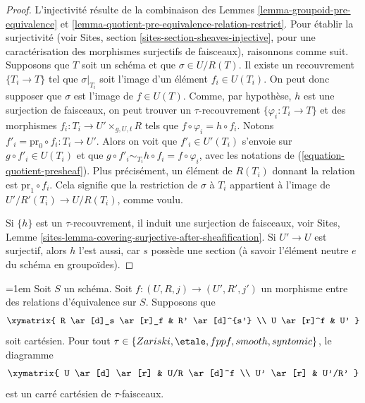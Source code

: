 \begin{proof}
L'injectivité résulte de la combinaison des
Lemmes \ref{lemma-groupoid-pre-equivalence} et
\ref{lemma-quotient-pre-equivalence-relation-restrict}.
Pour établir la surjectivité (voir
Sites, section \ref{sites-section-sheaves-injective},
pour une caractérisation des morphismes surjectifs de faisceaux), raisonnons comme suit.
Supposons que $T$ soit un schéma et que $\sigma \in U/R(T)$.
Il existe un recouvrement $\{T_i \to T\}$ tel que $\sigma|_{T_i}$
soit l'image d'un élément $f_i \in U(T_i)$. On peut donc
supposer que $\sigma$ est l'image de $f \in U(T)$.
Comme, par hypothèse, $h$ est une surjection de faisceaux, on
peut trouver un $\tau$-recouvrement $\{\varphi_i : T_i \to T\}$ et des morphismes
$f_i : T_i \to U' \times_{g, U, t} R$ tels que
$f \circ \varphi_i = h \circ f_i$. Notons
$f'_i = \text{pr}_0 \circ f_i : T_i \to U'$. Alors on voit que
$f'_i \in U'(T_i)$ s'envoie sur $g \circ f'_i \in U(T_i)$ et
que $g \circ f'_i \sim_{T_i} h \circ f_i = f \circ \varphi_i$,
avec les notations de (\ref{equation-quotient-presheaf}). Plus précisément, un
élément de $R(T_i)$ donnant la relation est $\text{pr}_1 \circ f_i$.
Cela signifie que la restriction
de $\sigma$ à $T_i$ appartient à l'image de $U'/R'(T_i) \to U/R(T_i)$,
comme voulu.

\medskip\noindent
Si $\{h\}$ est un $\tau$-recouvrement, il induit une surjection de faisceaux, voir
Sites, Lemme \ref{sites-lemma-covering-surjective-after-sheafification}.
Si $U' \to U$ est surjectif, alors $h$ l'est aussi, car $s$ possède une section
(à savoir l'élément neutre $e$ du schéma en groupoïdes).
\end{proof}

\begin{lemma}\emergencystretch=1em
\label{lemma-criterion-fibre-product}
Soit $S$ un schéma. Soit $f : (U, R, j) \to (U', R', j')$ un morphisme
entre des relations d'équivalence sur $S$. Supposons que
$$
\xymatrix{
R \ar[d]_s \ar[r]_f & R' \ar[d]^{s'} \\
U \ar[r]^f & U'
}
$$
soit cartésien. Pour tout
$\tau \in\allowbreak \{Zariski,\allowbreak \etale,\allowbreak fppf,\allowbreak smooth,\allowbreak syntomic\}$,
le diagramme
$$
\xymatrix{
U \ar[d] \ar[r] & U/R \ar[d]^f \\
U' \ar[r] & U'/R'
}
$$
est un carré cartésien de $\tau$-faisceaux.
\end{lemma}


